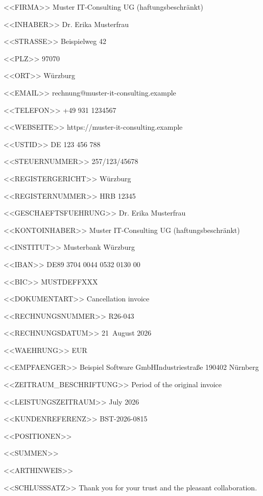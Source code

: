 <<FIRMA>>
Muster IT-Consulting UG (haftungsbeschränkt)

<<INHABER>>
Dr. Erika Musterfrau

<<STRASSE>>
Beispielweg 42

<<PLZ>>
97070

<<ORT>>
Würzburg

<<EMAIL>>
rechnung@muster-it-consulting.example

<<TELEFON>>
+49 931 1234567

<<WEBSEITE>>
https://muster-it-consulting.example

<<USTID>>
DE 123 456 788

<<STEUERNUMMER>>
257/123/45678

<<REGISTERGERICHT>>
Würzburg

<<REGISTERNUMMER>>
HRB 12345

<<GESCHAEFTSFUEHRUNG>>
Dr. Erika Musterfrau

<<KONTOINHABER>>
Muster IT-Consulting UG (haftungsbeschränkt)

<<INSTITUT>>
Musterbank Würzburg

<<IBAN>>
DE89 3704 0044 0532 0130 00

<<BIC>>
MUSTDEFFXXX

<<DOKUMENTART>>
Cancellation invoice

<<RECHNUNGSNUMMER>>
R26-043

<<RECHNUNGSDATUM>>
21~August 2026

<<WAEHRUNG>>
EUR

<<EMPFAENGER>>
Beispiel Software GmbH\zeilenwechsel{}Industriestraße 1\zeilenwechsel{}90402 Nürnberg

<<ZEITRAUM_BESCHRIFTUNG>>
Period of the original invoice

<<LEISTUNGSZEITRAUM>>
July 2026

<<KUNDENREFERENZ>>
BST-2026-0815

<<POSITIONEN>>
 \positionstrenner{}

<<SUMMEN>>
   \summentrenner{}

<<ARTHINWEIS>>

<<SCHLUSSSATZ>>
Thank you for your trust and the pleasant collaboration.
